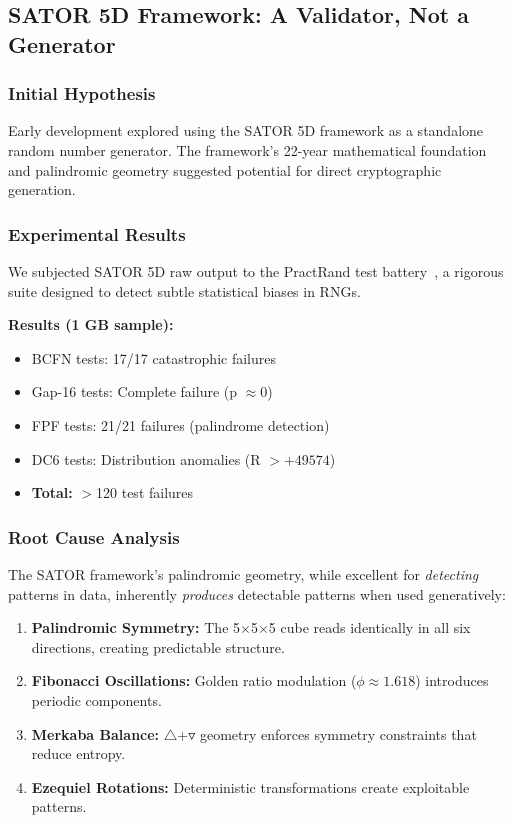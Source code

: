 \subsection{SATOR 5D Framework: A Validator, Not a Generator}

\subsubsection{Initial Hypothesis}

Early development explored using the SATOR 5D framework as a standalone random number generator. The framework's 22-year mathematical foundation and palindromic geometry suggested potential for direct cryptographic generation.

\subsubsection{Experimental Results}

We subjected SATOR 5D raw output to the PractRand test battery~\cite{doty-humphrey2014practrand}, a rigorous suite designed to detect subtle statistical biases in RNGs.

\textbf{Results (1 GB sample):}
\begin{itemize}
    \item BCFN tests: 17/17 catastrophic failures
    \item Gap-16 tests: Complete failure (p $\approx 0$)
    \item FPF tests: 21/21 failures (palindrome detection)
    \item DC6 tests: Distribution anomalies (R $> +49574$)
    \item \textbf{Total:} $>$120 test failures
\end{itemize}

\subsubsection{Root Cause Analysis}

The SATOR framework's palindromic geometry, while excellent for \emph{detecting} patterns in data, inherently \emph{produces} detectable patterns when used generatively:

\begin{enumerate}
    \item \textbf{Palindromic Symmetry:} The 5$\times$5$\times$5 cube reads identically in all six directions, creating predictable structure.
    \item \textbf{Fibonacci Oscillations:} Golden ratio modulation ($\phi \approx 1.618$) introduces periodic components.
    \item \textbf{Merkaba Balance:} $\triangle$+$\triangledown$ geometry enforces symmetry constraints that reduce entropy.
    \item \textbf{Ezequiel Rotations:} Deterministic transformations create exploitable patterns.
\end{enumerate}

